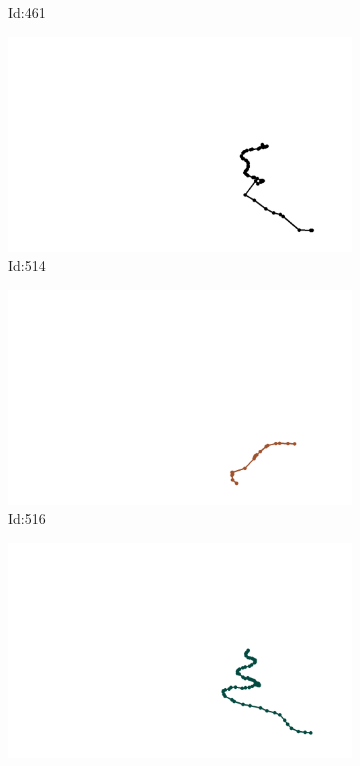 \documentclass[12pt,twoside]{report}
\begin{document}
\begin{figure}
\begin{subfigure}[b]{0.20\textwidth}
\caption{Id:461}
\end{subfigure}
\begin{subfigure}[b]{0.20\textwidth}
\centering
\includegraphics[width=\textwidth]{../trajectories/514.png}
\caption{Id:514}
\end{subfigure}
\begin{subfigure}[b]{0.20\textwidth}
\centering
\includegraphics[width=\textwidth]{../trajectories/516.png}
\caption{Id:516}
\end{subfigure}
\begin{subfigure}[b]{0.20\textwidth}
\centering
\includegraphics[width=\textwidth]{../trajectories/545.png}

\end{subfigure}
\end{figure}
\end{document}
